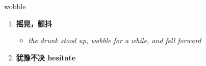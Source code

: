 
\begin{frame}
{\huge wobble}
\begin{center}
\begin{enumerate}\Large
  \item \textbf{摇晃，颤抖}
  \begin{itemize}
    \item \em{\Large{the drunk stood up, wobble for a while, and fell forward}}
  \end{itemize}
  \item \textbf{犹豫不决 hesitate}
\end{enumerate}
\end{center}
\end{frame}
